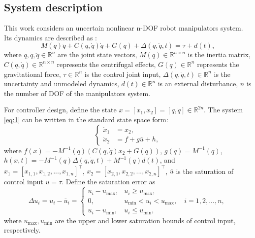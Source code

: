 \documentclass[pdflatex,sn-mathphys-num]{sn-jnl}%
\theoremstyle{thmstyleone}%
\theoremstyle{thmstyletwo}%
\theoremstyle{thmstylethree}%
\begin{document}
\subsection{System description}
\par This work considers an uncertain nonlinear n-DOF robot manipulators system. Its dynamics are described as \cite{SciaviccoSiciliano_2012_ModellingControl,BagheriEtAl_2019_Feedbacklinearization}:
\begin{equation}
	M(q)\ddot{q} + C(q, \dot{q})\dot{q} + G(q)+ \Delta(q, \dot{q}, t)= \tau + d(t),
	\label{eq:1}
\end{equation}
where $ q, \dot{q}, \ddot{q} \in \mathbb{R}^n $ are the joint state vectors, $M(q) \in \mathbb{R}^{n\times n}$ is the inertia matrix, $C(q, \dot{q}) \in \mathbb{R}^{n\times n} $ represents the centrifugal effects, $G(q) \in \mathbb{R}^n $ represents the gravitational force, $\tau \in \mathbb{R}^n$ is the control joint input, $\Delta(q, \dot{q}, t) \in \mathbb{R}^n$ is the uncertainty and unmodeled dynamics, $d(t) \in \mathbb{R}^n$ is an external disturbance, $n$ is the number of DOF of the manipulators system.

For controller design, define the state $x = [x_1,x_2] = [q,\dot{q}] \in \mathbb{R}^{2n}$. The system \cref{eq:1} can be written in the standard state space form:
\begin{equation}
	\left\{
	\begin{aligned}
		\dot{x}_1 & = x_2,     \\
		\dot{x}_2 & =f +g \bar{u} +h,
	\end{aligned}
	\right.
	\label{eq:2}
\end{equation}
where $f(x)=-M^{-1}(q) (C(q,\dot{q})x_2 + G(q)) $, $g(q)=M^{-1}(q)$, $h(x,t)=-M^{-1}(q)\Delta(q,\dot{q},t) +M^{-1}(q) d(t)$, and $x_1=[x_{1,1},x_{1,2},...,x_{1,n}]^{\top}$, $x_2=[x_{2,1},x_{2,2},...,x_{2,n}]^{\top}$, $\bar{u}$ is the saturation of control input $u=\tau$. Define the saturation error as
\begin{equation}\label{eq:3}
\Delta u_{i} =  u_{i}-\bar{u}_{i}=\begin{cases} 
	u_{i}-u_{\max}, & u_i \geq u_{\max}, \\
0,       & u_{\min} < u_i < u_{\max},  \quad i=1,2,...,n,\\
u_{i}-u_{\min}, & u_i \leq u_{\min},
\end{cases}
\end{equation}
where $u_{\max},u_{\min}$ are the upper and lower saturation bounds of control input, respectively.
\end{document}
